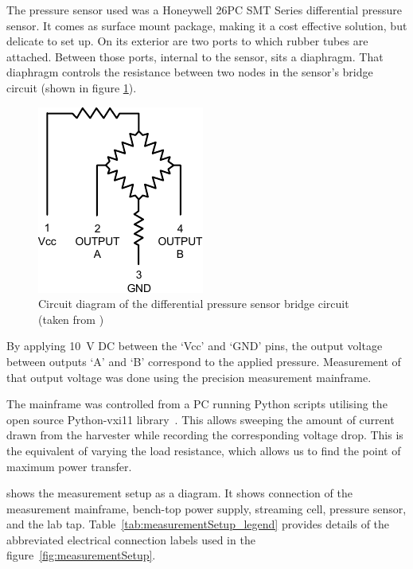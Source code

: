     The pressure sensor used was a Honeywell 26PC SMT Series differential pressure sensor.
    It comes as surface mount package, making it a cost effective solution, but delicate to set up.
    On its exterior are two ports to which rubber tubes are attached.
    Between those ports, internal to the sensor, sits a diaphragm.
    That diaphragm controls the resistance between two nodes in the sensor's bridge circuit (shown in figure \ref{fig:PressureSensorSchematic}).
    \begin{figure}
        \centering
        \includegraphics{content/pt1/01-PowerHarvesting/graphics/PressureSensorSchematic}
        \caption{\label{fig:PressureSensorSchematic}Circuit diagram of the differential pressure sensor bridge circuit (taken from \cite{Honeywell2003})}
    \end{figure}
    By applying \SI{10}{\volt} DC between the `Vcc' and `GND' pins, the output voltage between outputs `A' and `B' correspond to the applied pressure.
    Measurement of that output voltage was done using the precision measurement mainframe.

    The mainframe was controlled from a PC running Python scripts utilising the open source Python-vxi11 library~\cite{Python-ivi2014}.
    This allows sweeping the amount of current drawn from the harvester while recording the corresponding voltage drop.
    This is the equivalent of varying the load resistance, which allows us to find the point of maximum power transfer.

     shows the measurement setup as a diagram.
    It shows connection of the measurement mainframe, bench-top power supply, streaming cell, pressure sensor, and the lab tap.
    Table~\ref{tab:measurementSetup_legend} provides details of the abbreviated electrical connection labels used in the figure~\ref{fig:measurementSetup}.

